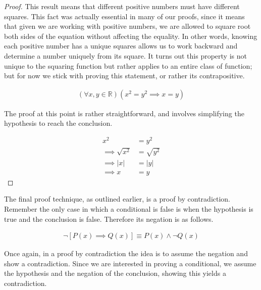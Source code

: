 \documentclass[twoside]{report}
\begin{document}
\begin{proof}
	This result means that different positive numbers must have different squares. This fact was actually essential in many of our proofs, since it means that given we are working with positive numbers, we are allowed to square root both sides of the equation without affecting the equality. In other words, knowing each positive number has a unique squares allows us to work backward and determine a number uniquely from its square. It turns out this property is not unique to the squaring function but rather applies to an entire class of function; but for now we stick with proving this statement, or rather its contrapositive.
	
	\begin{align*}
		(\forall x, y \in \mathbb{R})(x^2 = y^2 \implies x = y)
	\end{align*}
	
	The proof at this point is rather straightforward, and involves simplifying the hypothesis to reach the conclusion.
	
	\begin{align*}
		x^2 &= y^2 \\
		\implies \sqrt{x^2} &= \sqrt{y^2} \\
		\implies |x| &= |y| \\
		\implies x &= y
	\end{align*}
\end{proof}
\vspace{\baselineskip}

The final proof technique, as outlined earlier, is a proof by contradiction. Remember the only case in which a conditional is false is when the hypothesis is true and the conclusion is false. Therefore its negation is as follows.

\begin{align*}
	\neg[P(x) \implies Q(x)] \equiv P(x) \wedge \neg Q(x)
\end{align*}

Once again, in a proof by contradiction the idea is to assume the negation and show a contradiction. Since we are interested in proving a conditional, we assume the hypothesis and the negation of the conclusion, showing this yields a contradiction.

\end{document}
